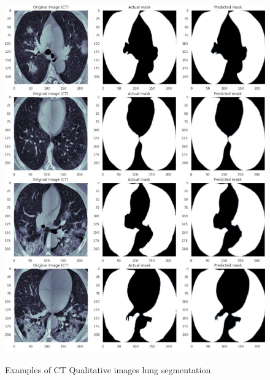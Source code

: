  \begin{figure}[H]
    \centering
    \includegraphics[width=1\textwidth,height=15cm,keepaspectratio]{Images/CTScanQualitativeImage1.png}\\
    \caption{Examples of CT Qualitative images lung segmentation\cite{litReviewDeepLearningCovid19}}
    \label{fig:Examples of CT Qualitative images lung segmentation}
\end{figure}
\vspace{0.5mm}
